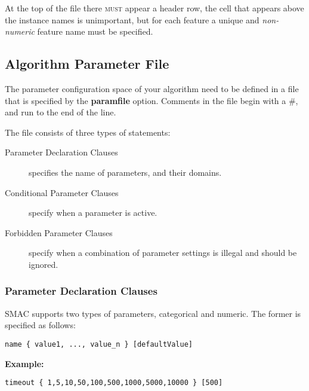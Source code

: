 \documentclass[manual.tex]{subfiles}
\begin{document}
At the top of the file there \textsc{must} appear a header row, the cell that appears above the instance names is unimportant, but for each feature a unique and \emph{non-numeric} feature name must be specified.

\subsection{Algorithm Parameter File} \label{sec:paramfile}

 


The parameter configuration space of your algorithm need to be defined in a file
that is specified by the \textbf{paramfile} option. Comments in the file begin 
with a \#, and run to the end of the line.

The file consists of three types of statements:
\begin{description}
\item[Parameter Declaration Clauses] specifies the name of parameters, and their domains.
\item[Conditional Parameter Clauses] specify when a parameter is active.
\item[Forbidden Parameter Clauses] specify when a combination of parameter settings is illegal and should be ignored.
\end{description}

\subsubsection{Parameter Declaration Clauses}\label{sec:param_decl_clauses}

SMAC supports two types of parameters, categorical and numeric. The former is specified as follows:

\texttt{name~\{~value1,~...,~value\_n~\}~{[}defaultValue{]}}

\vspace{5pt}
\textbf{Example:}
\vspace{2pt}


\texttt{timeout~\{~1,5,10,50,100,500,1000,5000,10000~\}~{[}500{]}}
\end{document}
